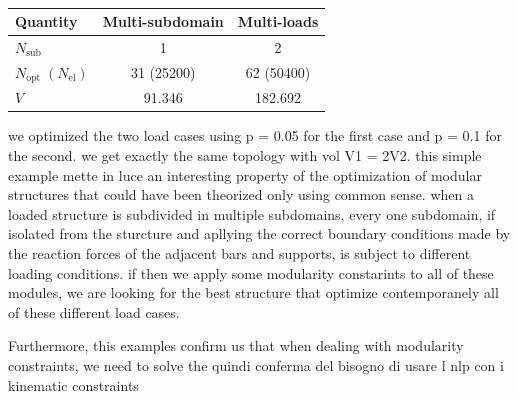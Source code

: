 \begin{table}
    \centering
    \small
    \begin{tabular}{lcc}
        \toprule
        \textbf{Quantity} & Multi-subdomain & Multi-loads \\ \midrule
    $N_\text{sub}$       &1& 2   \\
    $N_\text{opt}\;(N_\text{el})$ & 31 (25200)& 62 (50400) \\
    $V$ & 91.346 & 182.692  \\ \bottomrule
    \end{tabular}
    \caption{}
    \label{tab:05_}
    \end{table}

we optimized the two load cases using p = 0.05 for the first case and p = 0.1 for the second. we get exactly the same topology with vol V1 = 2V2. this simple example mette in luce an interesting property of the optimization of modular structures that could have been theorized only using common sense. when a loaded structure is subdivided in multiple subdomains, every one subdomain, if isolated from the sturcture and apllying the correct boundary conditions made by the reaction forces of the adjacent bars and supports, is subject to different loading conditions. if then we apply some modularity constarints to all of these modules, we are looking for the best structure that optimize contemporanely all of these different load cases.

\begin{figure}[]
    \hspace*{\fill}
    \hfill
    \hspace*{\fill}
    \caption{}
    \label{fig:05_cell_multi_eq}
\end{figure}
Furthermore, this examples confirm us that when dealing with modularity constraints, we need to solve the quindi conferma del bisogno di usare l nlp con i kinematic constraints

